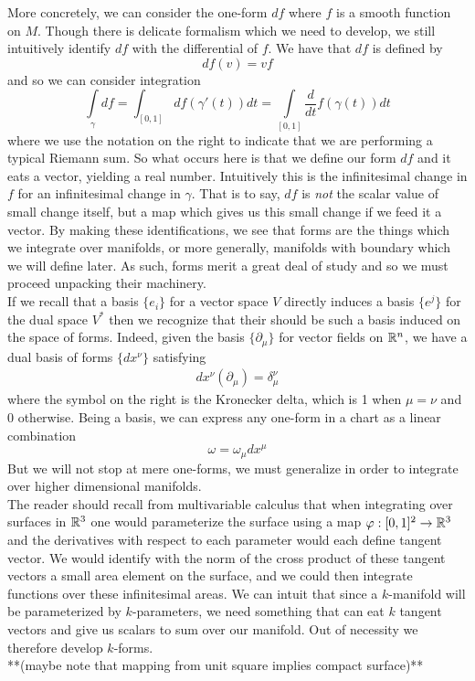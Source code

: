   More concretely, we can consider the one-form $df$ where $f$ is a smooth function on $M$.  Though there is delicate formalism which we need to develop, we still intuitively identify $df$ with the differential of $f$.  We have that $df$ is defined by 
\begin{equation*}
	df(v) = vf
\end{equation*} 
and so we can consider integration 
\begin{equation*}
	\int\limits_\gamma df = \int_{[0, 1]} df(\gamma'(t)) dt = \int\limits_{[0, 1]} \frac{d}{dt}f(\gamma(t)) dt
\end{equation*}
where we use the notation on the right to indicate that we are performing a typical Riemann sum.  So what occurs here is that we define our form $df$ and it eats a vector, yielding a real number.  Intuitively this is the infinitesimal change in $f$ for an infinitesimal change in $\gamma$.  That is to say, $df$ is \textit{not} the scalar value of small change itself, but a map which gives us this small change if we feed it a vector.  By making these identifications, we see that forms are the things which we integrate over manifolds, or more generally, manifolds with boundary which we will define later.  As such, forms merit a great deal of study and so we must proceed unpacking their machinery. \\

If we recall that a basis $\{e_i\}$ for a vector space $V$ directly induces a basis $\{e^j\}$ for the dual space $V^*$ then we recognize that their should be such a basis induced on the space of forms.  Indeed, given the basis $\{ \partial_\mu\}$ for vector fields on $\mathbb{R}^n$, we have a dual basis of forms $\{ dx^\nu \}$ satisfying 
\begin{align*}
	dx^\nu(\partial_\mu) = \delta^\nu_\mu
\end{align*}
where the symbol on the right is the Kronecker delta, which is 1 when $\mu = \nu$ and 0 otherwise.  Being a basis, we can express any one-form in a chart as a linear combination 
\begin{equation*}
	\omega = \omega_\mu dx^\mu
\end{equation*}
But we will not stop at mere one-forms, we must generalize in order to integrate over higher dimensional manifolds.\\

 The reader should recall from multivariable calculus that when integrating over surfaces in $\mathbb{R}^3$ one would parameterize the surface using a map $\varphi:[0, 1]^2 \to \mathbb{R}^3$ and the derivatives with respect to each parameter would each define tangent vector.  We would identify with the norm of the cross product of these tangent vectors a small area element on the surface, and we could then integrate functions over these infinitesimal areas.  We can intuit that since a $k$-manifold will be parameterized by $k$-parameters, we need something that can eat $k$ tangent vectors and give us scalars to sum over our manifold.  Out of necessity we therefore develop $k$-forms.\\
 **(maybe note that mapping from unit square implies compact surface)**\\
 
